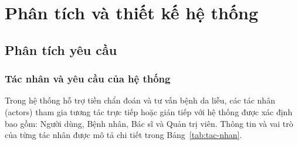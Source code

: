 \chapter[\MakeUppercase{Phân tích và thiết kế hệ thống}]{Phân tích và thiết kế hệ thống}
\label{ch:chuong2}


\section{Phân tích yêu cầu}

\subsection{Tác nhân và yêu cầu của hệ thống}

Trong hệ thống hỗ trợ tiền chẩn đoán và tư vấn bệnh da liễu, các tác nhân (actors) tham gia tương tác trực tiếp hoặc gián tiếp với hệ thống được xác định bao gồm: Người dùng, Bệnh nhân, Bác sĩ và Quản trị viên. Thông tin và vai trò của từng tác nhân được mô tả chi tiết trong Bảng~\ref{tab:tac-nhan}.

